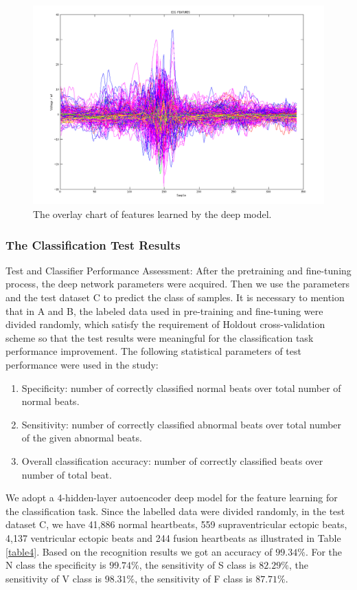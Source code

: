 \documentclass[journal]{IEEEtran}
\begin{document}
\begin{figure}[]
\centering
\includegraphics[width=3.5 in]{eps/features.png}
\caption{The overlay chart of features learned by the deep model.}
\label{figure4}
\end{figure}



\subsubsection{The Classification Test Results}
Test and Classifier Performance Assessment: After the pretraining and fine-tuning process, the deep network parameters were acquired. Then we use the parameters and the test dataset C to predict the class of samples. It is necessary to mention that in A and B, the labeled data used in pre-training and fine-tuning were divided randomly, which satisfy the requirement of Holdout cross-validation scheme so that the test results were meaningful for the classification task performance improvement.
The following statistical parameters of test performance were used in the study:
\begin{enumerate}
\item Specificity: number of correctly classified normal beats over total number of normal beats.
\item Sensitivity: number of correctly classified abnormal beats over total number of the given abnormal beats.
\item Overall classification accuracy: number of correctly classified beats over number of total beat.
\end{enumerate}

We adopt a 4-hidden-layer autoencoder deep model for the feature learning for the classification task. Since the labelled data were divided randomly, in the test dataset C, we have 41,886 normal heartbeats, 559 supraventricular ectopic beats, 4,137 ventricular ectopic beats and 244 fusion heartbeats as illustrated in Table \ref{table4}. Based on the recognition results we got an accuracy of $99.34\%$. For the N class the specificity is $99.74\%$, the sensitivity of S class is $82.29\%$, the sensitivity of V class is $98.31\%$, the sensitivity of F class is $87.71\%$.
\end{document}
